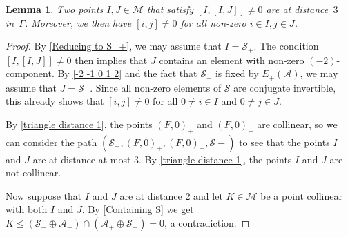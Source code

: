\documentclass[oneside,a4paper]{amsart} %
\newtheorem{lemma}[theorem]{Lemma}
\theoremstyle{definition}
\newcommand{\A}{\mathcal{A}}
\renewcommand{\SS}{\mathcal{S}}
\newcommand{\M}{\mathcal{M}}
\numberwithin{equation}{section}
\begin{document}
\begin{lemma}
\label{triangle distance 3}
	Two points $I,J\in\M$ that satisfy $[I,[I,J]]\neq 0$ are at distance~$3$ in~$\Gamma$.
	Moreover, we then have $[i,j] \neq 0$ for all non-zero $i \in I, j \in J$.
\end{lemma}
\begin{proof}
	By \cref{Reducing to S_+}, we may assume that $I=\SS_+$.
	The condition $[I,[I,J]]\neq 0$ then implies that $J$ contains an element with non-zero $(-2)$-component.
	By \cref{-2 -1 0 1 2} and the fact that $\SS_+$ is fixed by $E_+(\A)$, we may assume that $J=\SS_-$.
	Since all non-zero elements of $\SS$ are conjugate invertible, this already shows that $[i,j] \neq 0$ for all $0 \neq i \in I$ and $0 \neq j \in J$.
	
	By \cref{triangle distance 1}, the points $(F,0)_+$ and $(F,0)_-$ are collinear, so we can consider the path $(\SS_+,(F,0)_+,(F,0)_-,\SS-)$ to see that the points $I$ and $J$ are at distance at most $3$.
	By \cref{triangle distance 1}, the points $I$ and $J$ are not collinear.

	Now suppose that $I$ and $J$ are at distance $2$ and let $K\in\M$ be a point collinear with both $I$ and $J$.
	By \cref{Containing S} we get $K\leq (\SS_-\oplus \A_-)\cap (\A_+\oplus \SS_+)=0$, a contradiction.
\end{proof}
\end{document}

